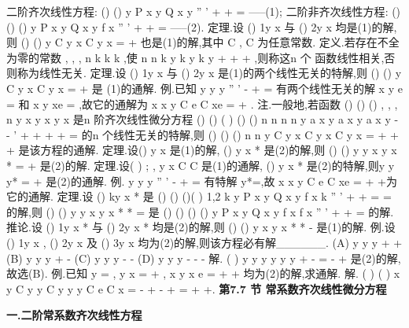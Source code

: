 \textcolor{lyred}{二阶齐次线性方程}:
()
()
y
P x y
Q x y
''
'
+
+
=
-----(1); 
\textcolor{lyred}{二阶非齐次线性方程}:
()
()
()
y
P x y
Q x y
f x
''
'
+
+
=
-----(2). 
\textcolor{lyred}{定理}.设
()
1y
x 与
()
2y
x 均是(1)的解,则
()
()
y
C y
x
C y
x
=
+
也是(1)的解,其中 
C ,
C 为任意常数. 
\textcolor{lyred}{定义}.若存在不全为零的常数
,
,
,
n
k k
k
\Lambda 
,使
n
n
k y
k y
k y
+
+
+
\equiv 
\Lambda 
,则称这n 个 
函数\textcolor{lyred}{线性相关},否则称为\textcolor{lyred}{线性无关}. 
\textcolor{lyred}{定理}.设
()
1y
x 与
()
2y
x 是(1)的两个线性无关的特解,则
()
()
y
C y
x
C y
x
=
+
是 
(1)的通解. 
\textcolor{lyred}{例}.已知
y
y
y
''
'
-
+
=
有两个线性无关的解
x
y
e
=
和
x
y
xe
=
,故它的通解为 
x
x
y
C e
C xe
=
+
. 
\textcolor{lyred}{注}.一般地,若函数
()
()
()
,
,
,
n
y
x
y
x
y
x
\Lambda 
是n 阶齐次线性微分方程 
()
()
(
)
()
()
n
n
n
n
y
a
x y
a
x y
a
x y
-
-
'
+
+
+
+
=
\Lambda 
的n 个线性无关的特解,则 
()
()
()
n
n
y
C y
x
C y
x
C y
x
=
+
+
+
\Lambda 
是该方程的通解. 
\textcolor{lyred}{定理}.设()
y x 是(1)的解,
()
y
x
*
是(2)的解,则
()
()
y
y x
y
x
*
=
+
是(2)的解. 
\textcolor{lyred}{定理}.设(
)
;
,
y x C C
是(1)的通解,
()
y
x
*
是(2)的特解,则y
y
y*
=
+
是(2)的通解. 
\textcolor{lyred}{例}.
y
y
y
''
'
-
+
=
有特解
y*=,故
x
x
y
C e
C xe
=
+
+为它的通解. 
\textcolor{lyred}{定理}.设
()
ky
x
*
是
()
()
()(
)
1,2
k
y
P x y
Q x y
f
x
k
''
'
+
+
=
=
的解,则 
()
()
y
y
x
y
x
*
*
=
\pm 
是
()
()
()
()
y
P x y
Q x y
f
x
f
x
''
'
+
+
=
\pm 
的解. 
\textcolor{lyred}{推论}.设
()
1y
x
*
与
()
2y
x
*
均是(2)的解,则
()
()
y
x
y
x
*
*
-
是(1)的解. 
\textcolor{lyred}{例}.设
()
1y
x ,
()
2y
x 及
()
3y
x 均为(2)的解,则该方程必有解______. 
(A)
y
y
y
+
+
   (B)
y
y
y
+
-
   (C)
y
y
y
-
-
   (D)
y
y
y
-
-
-
解.
(
)
y
y
y
y
y
y
+
-
=
-
+
是(2)的解,故选(B). 
\textcolor{lyred}{例}.已知
y =
,
y
x
=
+
,
x
y
x
e
=
+
+
均为(2)的解,求通解. 
解.
(
)
(
)
x
y
C
y
y
C
y
y
y
C e
C x
=
-
+
-
+
=
+
+. 
\vspace{6pt}
{\large \bfseries \textcolor{lyred}{第7.7 节 常系数齐次线性微分方程}}

\vspace{4pt}
{\bfseries \textcolor{lyred}{一.二阶常系数齐次线性方程}}

